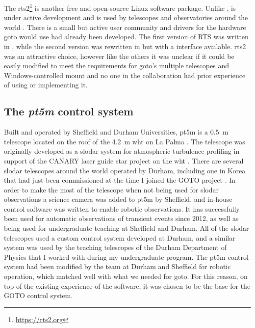 \begin{colsection}
\begin{colsection}
\subsubsection{}

The \gls{rts2}\footnote{\url{https://rts2.org}} \citep{RTS2, RTS2b} is another free and open-source Linux software package. Unlike ,  is under active development and is used by telescopes and observatories around the world \citep{BORAT, BOOTES-3, antarctic, ARTN}. There is a small but active user community and drivers for the hardware \gls{goto} would use had already been developed. The first version of RTS was written in , while the second version was rewritten in  but with a  interface available. \gls{rts2} was an attractive choice, however like the others it was unclear if it could be easily modified to meet the requirements for \gls{goto}'s multiple telescopes and Windows-controlled mount and no one in the collaboration had prior experience of using or implementing it.

\end{colsection}


\subsection{The \textit{pt5m} control system}
\label{sec:pt5m}
\begin{colsection}

Built and operated by Sheffield and Durham Universities, \gls{pt5m} is a \SI{0.5}{\metre} telescope located on the roof of the \SI{4.2}{\metre} \gls{wht} on La Palma \citep{pt5m}. The telescope was originally developed as a \gls{slodar} system for atmospheric turbulence profiling in support of the CANARY laser guide star project on the \gls{wht} \citep{SLODAR_LaPalma, CANARY}. There are several \gls{slodar} telescopes around the world operated by Durham, including one in Korea that had just been commissioned at the time I joined the GOTO project \citep{SLODAR_Korea}. In order to make the most of the telescope when not being used for \gls{slodar} observations a science camera was added to \gls{pt5m} by Sheffield, and in-house control software was written to enable robotic observations. It has successfully been used for automatic observations of transient events since 2012, as well as being used for undergraduate teaching at Sheffield and Durham. All of the \gls{slodar} telescopes used a custom control system developed at Durham, and a similar system was used by the teaching telescopes of the Durham Department of Physics that I worked with during my undergraduate program. The \gls{pt5m} control system had been modified by the team at Durham and Sheffield for robotic operation, which matched well with what we needed for \gls{goto}. For this reason, on top of the existing experience of the software, it was chosen to be the base for the GOTO control system.


\end{colsection}
\end{colsection}
